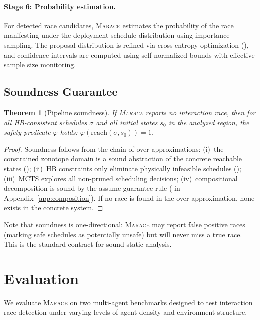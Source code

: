 \documentclass[11pt]{article}
\newtheorem{theorem}{Theorem}[section]
\newcommand{\marace}{\textsc{Marace}}
\begin{document}
\paragraph{Stage 6: Probability estimation.}
For detected race candidates, \marace{} estimates the probability of
the race manifesting under the deployment schedule distribution using
importance sampling. The proposal distribution is refined via cross-entropy
optimization (), and confidence intervals
are computed using self-normalized bounds with effective sample size
monitoring.

\subsection{Soundness Guarantee}

\begin{theorem}[Pipeline soundness]
\label{thm:soundness}
If \marace{} reports no interaction race, then for all HB-consistent
schedules $\sigma$ and all initial states $s_0$ in the analyzed region,
the safety predicate $\varphi$ holds: $\varphi(\mathrm{reach}(\sigma, s_0)) = 1$.
\end{theorem}

\begin{proof}
Soundness follows from the chain of over-approximations:
(i)~the constrained zonotope domain is a sound abstraction of the concrete
reachable states ();
(ii)~HB constraints only eliminate physically infeasible schedules
();
(iii)~MCTS explores all non-pruned scheduling decisions;
(iv)~compositional decomposition is sound by the assume-guarantee
rule ( in Appendix~\ref{app:composition}).
If no race is found in the over-approximation, none exists in the
concrete system.
\end{proof}

Note that soundness is one-directional: \marace{} may report false
positive races (marking safe schedules as potentially unsafe) but will
never miss a true race. This is the standard contract for sound static
analysis.


\section{Evaluation}
\label{sec:eval}

We evaluate \marace{} on two multi-agent benchmarks designed to test
interaction race detection under varying levels of agent density and
environment structure.
\end{document}
